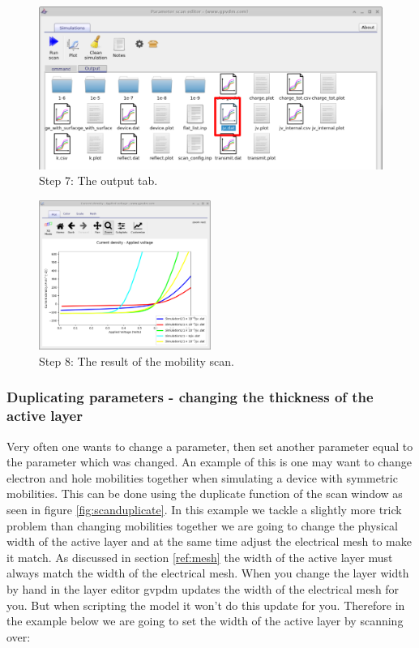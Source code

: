 \begin{figure}[H]
\centering
\includegraphics[width=\textwidth]{./images/param_scan_output.png}
\caption{Step 7: The output tab.}
\label{fig:scanoutput}
\end{figure}

\begin{figure}[H]
\centering
\includegraphics[width=0.5\textwidth]{./images/param_scan_jv.png}
\caption{Step 8: The result of the mobility scan.}
\label{fig:scanjv}
\end{figure}

\subsubsection{Duplicating parameters - changing the thickness of the active layer}

Very often one wants to change a parameter, then set another parameter equal to the parameter which was changed. An example of this is one may want to change electron and hole mobilities together when simulating a device with symmetric mobilities. This can be done using the duplicate function of the scan window as seen in figure \ref{fig:scanduplicate}.  In this example we tackle a slightly more trick problem than changing mobilities together we are going to change the physical width of the active layer and at the same time adjust the electrical mesh to make it match.  As discussed in section \ref{ref:mesh} the width of the active layer must always match the width of the electrical mesh.  When you change the layer width by hand in the layer editor gvpdm updates the width of the electrical mesh for you. But when scripting the model it won't do this update for you.  Therefore in the example below we are going to set the width of the active layer by scanning over:

